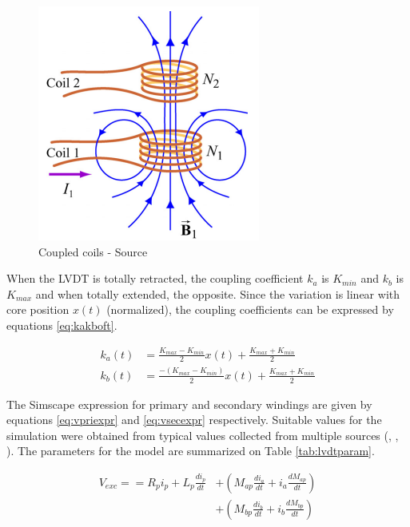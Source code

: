 \documentclass[conference]{IEEEtran}
\begin{document}
\begin{figure}[h!]
\centering
\includegraphics[scale=0.25]{pics/models/coil_coupling.png}
\caption{Coupled coils - Source \cite{coilsmut}}
\label{fig:coilcoupling}
\end{figure}

When the LVDT is totally retracted, the coupling coefficient $k_a$ is $K_{min}$ and $k_b$ is $K_{max}$ and when totally extended, the opposite. Since the variation is linear with core position $x(t)$ (normalized), the coupling coefficients can be expressed by equations \ref{eq:kakboft}.

\begin{equation}
\begin{split}
k_a(t) & = \frac{K_{max} - K_{min}}{2}x(t) + \frac{K_{max} + K_{min}}{2} \\
k_b(t) & = \frac{-(K_{max} - K_{min})}{2}x(t) + \frac{K_{max} + K_{min}}{2}
\end{split}
\label{eq:kakboft}
\end{equation}

The Simscape expression for primary and secondary windings are given by equations \ref{eq:vpriexpr} and \ref{eq:vsecexpr} respectively. Suitable values for the simulation were obtained from typical values collected from multiple sources (\cite{lvdtdatasheet1}, \cite{lvdtdatasheet2}, \cite{lvdtdatasheet3}). The parameters for the model are summarized on Table \ref{tab:lvdtparam}.

\begin{equation}
\begin{split}
V_{exc} == R_p i_p + L_p \frac{di_p}{dt} & + \left(M_{ap} \frac{di_a}{dt} + i_a \frac{dM_{ap}}{dt} \right) \\
	& + \left(M_{bp} \frac{di_b}{dt} + i_b \frac{dM_{bp}}{dt}\right)
\end{split}
\label{eq:vpriexpr}
\end{equation}
\end{document}

